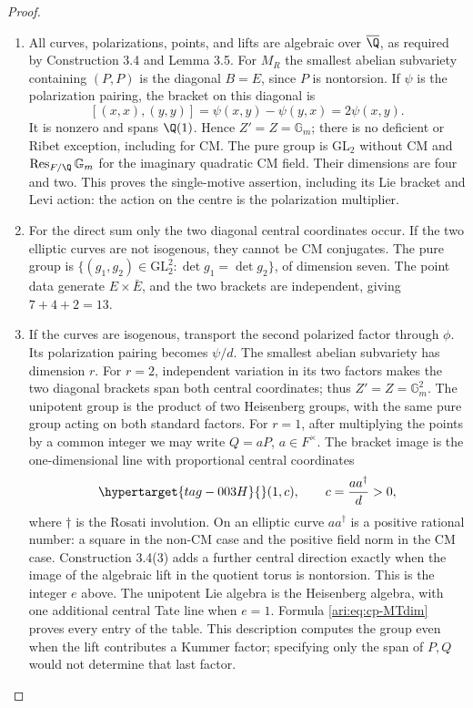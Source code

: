 \begin{proof}
\begin{enumerate}[label=\arabic*.,leftmargin=*]
\item All curves, polarizations, points, and lifts are algebraic over
$\overline\Q$, as required by Construction 3.4 and Lemma 3.5.
For $M_R$ the smallest abelian subvariety containing $(P,P)$ is
the diagonal $B=E$, since $P$ is nontorsion. If $\psi$ is the
polarization pairing, the bracket on this diagonal is
\[
 [(x,x),(y,y)]=\psi(x,y)-\psi(y,x)=2\psi(x,y).
\]
It is nonzero and spans $\Q(1)$. Hence $Z'=Z=\mathbb G_m$;
there is no deficient or Ribet exception, including for CM.
The pure group is $\mathrm{GL}_2$ without CM and
$\operatorname{Res}_{F/\Q}\mathbb G_m$ for the imaginary
quadratic CM field. Their dimensions are four and two.
This proves the single-motive assertion, including its Lie
bracket and Levi action: the action on the centre is the
polarization multiplier.

\item For the direct sum only the two diagonal central coordinates
occur. If the two elliptic curves are not isogenous, they
cannot be CM conjugates. The pure group is
$\{(g_1,g_2)\in\mathrm{GL}_2^2:\det g_1=\det g_2\}$,
of dimension seven. The point data generate $E\times\bar E$,
and the two brackets are independent, giving $7+4+2=13$.

\item If the curves are isogenous, transport the second polarized
factor through $\phi$. Its polarization pairing becomes
$\psi/d$. The smallest abelian subvariety has dimension $r$.
For $r=2$, independent variation in its two factors makes the
two diagonal brackets span both central coordinates; thus
$Z'=Z=\mathbb G_m^2$. The unipotent group is the product
of two Heisenberg groups, with the same pure group acting
on both standard factors.
For $r=1$, after multiplying the points by a common integer
we may write $Q=aP$, $a\in F^\times$. The bracket image is
the one-dimensional line with proportional central coordinates
\begin{equation}\hypertarget{tag-003H}{}\label{ari:eq:cp-positive-centre}
 (1,c),\qquad c=\frac{a a^\dagger}{d}>0,
\end{equation}
where $\dagger$ is the Rosati involution. On an elliptic curve
$aa^\dagger$ is a positive rational number: a square in the
non-CM case and the positive field norm in the CM case.
Construction 3.4(3) adds a further central direction exactly
when the image of the algebraic lift in the quotient torus
is nontorsion. This is the integer $e$ above.
The unipotent Lie algebra is the Heisenberg algebra, with one
additional central Tate line when $e=1$. Formula
\eqref{ari:eq:cp-MTdim} proves every entry of the table. This
description computes the group even when the lift contributes
a Kummer factor; specifying only the span of $P,Q$ would
not determine that last factor.
\end{enumerate}
\end{proof}





